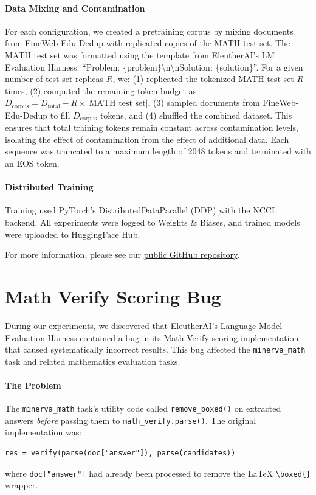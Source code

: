 \paragraph{Data Mixing and Contamination}
For each configuration, we created a pretraining corpus by mixing documents from FineWeb-Edu-Dedup \citep{penedo2024finewebdatasetsdecantingweb} with replicated copies of the MATH test set.
The MATH test set was formatted using the template from EleutherAI's LM Evaluation Harness: ``Problem: \{problem\}\textbackslash n\textbackslash nSolution: \{solution\}''.
For a given number of test set replicas $R$, we:
(1) replicated the tokenized MATH test set $R$ times,
(2) computed the remaining token budget as $D_{\text{corpus}} = D_{\text{total}} - R \times |\text{MATH test set}|$,
(3) sampled documents from FineWeb-Edu-Dedup to fill $D_{\text{corpus}}$ tokens, and
(4) shuffled the combined dataset.
This ensures that total training tokens remain constant across contamination levels, isolating the effect of contamination from the effect of additional data.
Each sequence was truncated to a maximum length of 2048 tokens and terminated with an EOS token.

\paragraph{Distributed Training}
Training used PyTorch's DistributedDataParallel (DDP) with the NCCL backend.
All experiments were logged to Weights \& Biases, and trained models were uploaded to HuggingFace Hub.

For more information, please see our \href{https://github.com/RylanSchaeffer/KoyejoLab-Memorization-Scoring-vs-Sampling/}{public GitHub repository}.

\clearpage

\section{Math Verify Scoring Bug}
\label{app:sec:math_verify_bug}

During our experiments, we discovered that EleutherAI's Language Model Evaluation Harness \citep{gao2024evalharness} contained a bug in its Math Verify scoring implementation that caused systematically incorrect results.
This bug affected the \texttt{minerva\_math} task and related mathematics evaluation tasks.

\paragraph{The Problem}
The \texttt{minerva\_math} task's utility code called \texttt{remove\_boxed()} on extracted answers \emph{before} passing them to \texttt{math\_verify.parse()}.
The original implementation was:
\begin{verbatim}
res = verify(parse(doc["answer"]), parse(candidates))
\end{verbatim}
where \texttt{doc["answer"]} had already been processed to remove the \LaTeX{} \verb|\boxed{}| wrapper.

